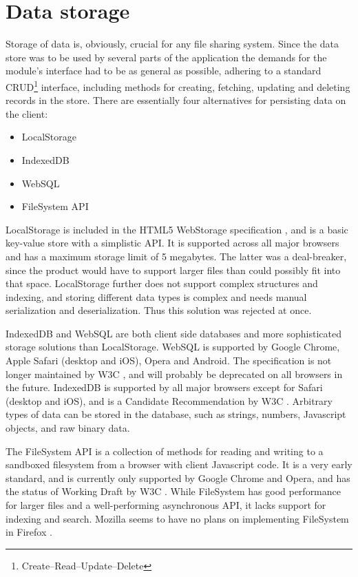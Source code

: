 

\section{Data storage}
\label{sec:datastorage}

Storage of data is, obviously, crucial for any file sharing system. Since the data store was to be used by several parts of the application the demands for the module's interface had to be as general as possible, adhering to a standard CRUD\footnote{Create–Read–Update–Delete} interface, including methods for creating, fetching, updating and deleting records in the store.
There are essentially four alternatives for persisting data on the client:

\begin{itemize}
\item LocalStorage
\item IndexedDB
\item WebSQL
\item FileSystem API
\end{itemize}

LocalStorage is included in the HTML5 WebStorage specification \cite{WebStorage:Online}, and is a basic key-value store with a simplistic API. It is supported across all major browsers and has a maximum storage limit of 5 megabytes. The latter was a deal-breaker, since the product would have to support larger files than could possibly fit into that space. LocalStorage further does not support complex structures and indexing, and storing different data types is complex and needs manual serialization and deserialization. Thus this solution was rejected at once.

IndexedDB and WebSQL are both client side databases and more sophisticated storage solutions than LocalStorage. WebSQL is supported by Google Chrome, Apple Safari (desktop and iOS), Opera and Android. The specification is not longer maintained by W3C \cite{WebSQL:Online}, and will probably be deprecated on all browsers in the future. IndexedDB is supported by all major browsers except for Safari (desktop and iOS), and is a Candidate Recommendation by W3C \cite{IndexedDB:Online}. Arbitrary types of data can be stored in the database, such as strings, numbers, Javascript objects, and raw binary data.

The FileSystem API is a collection of methods for reading and writing to a sandboxed filesystem from a browser with client Javascript code. It is a very early standard, and is currently only supported by Google Chrome and Opera, and has the status of Working Draft by W3C \cite{FileSystem:Online}. While FileSystem has good performance for larger files and a well-performing asynchronous API, it lacks support for indexing and search. Mozilla seems to have no plans on implementing FileSystem in Firefox \cite{MozillaFileSystem:Online}.

